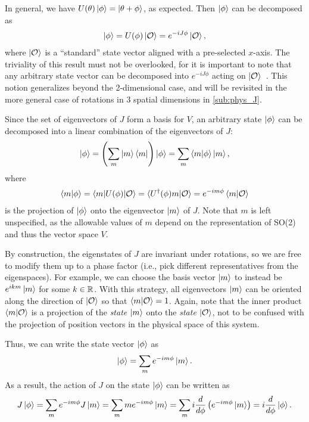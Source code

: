     In general, we have $U(\theta)\ket{\phi} = \ket{\theta+\phi}$, as expected. Then $\ket{\phi}$ can be decomposed as
    \begin{align*}
        \ket{\phi} = U(\phi)\ket{\mathcal{O}} = e^{-iJ\phi}\ket{\mathcal{O}},
    \end{align*}
    where $\ket{\mathcal{O}}$ is a ``standard'' state vector aligned with a pre-selected $x$-axis. The triviality of this result must not be overlooked, for it is important to note that any arbitrary state vector can be decomposed into $e^{-iJ\phi}$ acting on $\ket{\mathcal{O}}$~\cite{Tung1985}. This notion generalizes beyond the 2-dimensional case, and will be revisited in the more general case of rotations in 3 spatial dimensions in \cref{sub:phys_J}.

    Since the set of eigenvectors of $J$ form a basis for $V$, an arbitrary state $\ket{\phi}$ can be decomposed into a linear combination of the eigenvectors of $J$:
    \begin{align*}
        \ket{\phi} = \left( \sum_{m} \ket{m}\bra{m} \right)\ket{\phi} = \sum_{m} \braket{m|\phi}\ket{m},
    \end{align*}
    where
    \begin{align*}
        \braket{m|\phi} = \braket{m|U(\phi)|\mathcal{O}} = \braket{U^\dagger(\phi)m|\mathcal{O}} = e^{-im\phi}\braket{m|\mathcal{O}}
    \end{align*}
    is the projection of $\ket{\phi}$ onto the eigenvector $\ket{m}$ of $J$. Note that $m$ is left unspecified, as the allowable values of $m$ depend on the representation of SO(2) and thus the vector space $V$.

    By construction, the eigenstates of $J$ are invariant under rotations, so we are free to modify them up to a phase factor (i.e., pick  different representatives from the eigenspaces). For example, we can choose the basis vector $\ket{m}$ to instead be $e^{ikm}\ket{m}$ for some $k\in\mathbb{R}$.  With this strategy, all eigenvectors $\ket{m}$ can be oriented along the direction of $\ket{\mathcal{O}}$ so that $\braket{m|\mathcal{O}} = 1$. Again, note that the inner product $\braket{m|\mathcal{O}}$ is a projection of the \textit{state} $\ket{m}$ onto the \textit{state} $\ket{\mathcal{O}}$, not to be confused with the projection of position vectors in the physical space of this system.

    Thus, we can write the state vector $\ket{\phi}$ as
    \begin{align}
        \ket{\phi} = \sum_{m} e^{-im\phi}\ket{m}.\label{eq:phi2m}
    \end{align}
    As a result, the action of $J$ on the state $\ket{\phi}$ can be written as
    \begin{align*}
        J\ket{\phi} = \sum_{m} e^{-im\phi} J\ket{m} = \sum_{m} m e^{-im\phi}\ket{m} = \sum_{m} i \frac{d}{d\phi} \left( e^{-im\phi}\ket{m} \right) = i\frac{d}{d\phi}\ket{\phi}.
    \end{align*}


